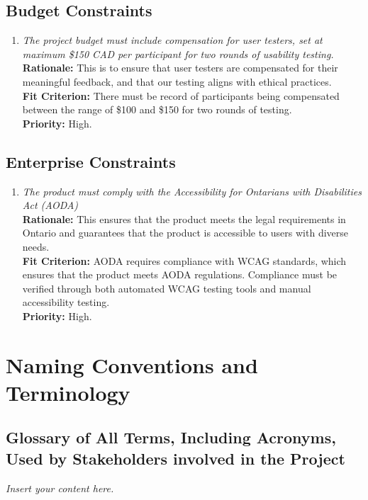 \documentclass[12pt]{article}
\newcommand{\lips}{\textit{Insert your content here.}}
\begin{document}
\subsection{Budget Constraints}
\begin{enumerate}[label=MD-BC \arabic*., wide=0pt, leftmargin=*]
  \item \emph{The project budget must include compensation for user
      testers, set at maximum \$150 CAD per participant for two rounds
    of usability testing.}\\[2mm]
    {\bf Rationale:} This is to ensure that user testers are
    compensated for their meaningful feedback,
    and that our testing aligns with ethical practices.\\
    {\bf Fit Criterion:} There must be record of participants being
    compensated between the range of \$100 and \$150 for
    two rounds of testing. \\
    {\bf Priority:} High.
\end{enumerate}
\subsection{Enterprise Constraints}
\begin{enumerate}[label=MD-EC \arabic*., wide=0pt, leftmargin=*]
  \item \emph{The product must comply with the Accessibility for
    Ontarians with Disabilities Act (AODA)}\\[2mm]
    {\bf Rationale:} This ensures that the product meets the legal
    requirements in Ontario and guarantees that
    the product is accessible to users with diverse needs.\\
    {\bf Fit Criterion:} AODA requires compliance with WCAG
    standards, which ensures that the product meets AODA regulations.
    Compliance must be verified through both automated WCAG testing
    tools and manual accessibility testing.\\
    {\bf Priority:} High.
\end{enumerate}

\section{Naming Conventions and Terminology}
\subsection{Glossary of All Terms, Including Acronyms, Used by Stakeholders
involved in the Project}
\lips
\end{document}

